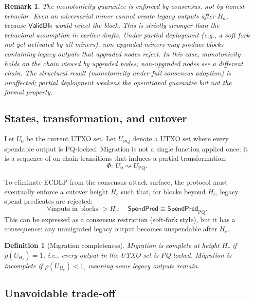\documentclass[11pt]{article}
\newtheorem{definition}{Definition}
\newtheorem{remark}{Remark}
\newcommand{\ValidBlk}{\mathsf{ValidBlk}}
\newcommand{\SpendPred}{\mathsf{SpendPred}}
\newcommand{\SpendPredPQ}{\SpendPred_{\mathrm{PQ}}}
\begin{document}
\begin{remark}
The monotonicity guarantee is enforced by consensus, not by honest behavior.
Even an adversarial miner cannot create legacy outputs after $H_a$, because $\ValidBlk$ would reject the block.
This is strictly stronger than the behavioral assumption in earlier drafts.
Under partial deployment (e.g., a soft fork not yet activated by all miners), non-upgraded miners may produce blocks containing legacy outputs that upgraded nodes reject.
In this case, monotonicity holds on the chain viewed by upgraded nodes; non-upgraded nodes see a different chain.
The structural result (monotonicity under full consensus adoption) is unaffected; partial deployment weakens the operational guarantee but not the formal property.
\end{remark}

\subsection{States, transformation, and cutover}
Let $U_0$ be the current UTXO set.
Let $U_{\mathrm{PQ}}$ denote a UTXO set where every spendable output is PQ-locked.
Migration is not a single function applied once; it is a sequence of on-chain transitions that induces a partial transformation:
\[
\Phi:\ U_0 \rightsquigarrow U_{\mathrm{PQ}}.
\]

To eliminate ECDLP from the consensus attack surface, the protocol must eventually enforce a cutover height $H_c$ such that, for blocks beyond $H_c$, legacy spend predicates are rejected:
\[
\forall \text{inputs in blocks } > H_c:\quad \SpendPred \equiv \SpendPredPQ.
\]
This can be expressed as a consensus restriction (soft-fork style), but it has a consequence: any unmigrated legacy output becomes unspendable after $H_c$.

\begin{definition}[Migration completeness]
Migration is \emph{complete} at height $H_c$ if $\rho(U_{H_c})=1$, i.e., every output in the UTXO set is PQ-locked.
Migration is \emph{incomplete} if $\rho(U_{H_c})<1$, meaning some legacy outputs remain.
\end{definition}

\subsection{Unavoidable trade-off}
\end{document}
